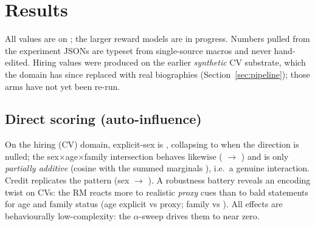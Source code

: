 \section{Results}
\label{sec:results}
All values are on \modelSmall{}; the larger reward models are in progress. Numbers pulled from the experiment
JSONs are typeset from single-source macros and never hand-edited. Hiring values were produced on the earlier
\emph{synthetic} CV substrate, which the domain has since replaced with real biographies
(Section~\ref{sec:pipeline}); those arms have not yet been re-run. 

\subsection{Direct scoring (auto-influence)}
On the hiring (CV) domain, explicit-sex \autoinf{} is \autoInflSexCVbase{}, collapsing to
\autoInflSexCVnull{} when the \diffmean{} direction is nulled; the sex$\times$age$\times$family intersection
behaves likewise (\autoInflIntersectionCVbase{} $\to$ \autoInflIntersectionCVnull{}) and is only
\emph{partially additive} (cosine with the summed marginals \additivityCosCV{}), i.e.\ a genuine interaction.
Credit replicates the pattern (sex \autoInflSexCreditbase{} $\to$ \autoInflSexCreditnull{}).
 A robustness
battery reveals an encoding twist on CVs: the RM reacts more to realistic \emph{proxy} cues than to bald
statements for age and family status (age \batteryAgeExplicitCV{} explicit vs \batteryAgeProxyCV{} proxy;
family \batteryFamilyExplicitCV{} vs \batteryFamilyProxyCV{}). All effects are behaviourally low-complexity:
the $\alpha$-sweep drives them to near zero.

